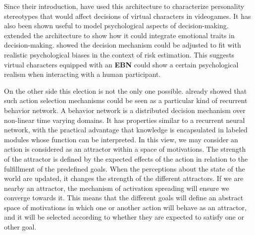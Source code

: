 \documentclass[
		twoside,openright,titlepage,numbers=noenddot,manychapters,
		headinclude,%
                footinclude=false,cleardoublepage=empty,
                BCOR=5mm,
		fontsize=11pt, %
                 enabledeprecatedfontcommands]{scrreprt}
\begin{document}
Since their introduction, \cite{DaSilvaCorreaPinto2005} have used this architecture to characterize personality stereotypes that would affect decisions of virtual characters in videogames. It has also been shown useful to model psychological aspects of decision-making. \cite{johansson2009affective} extended the architecture to show how it could integrate emotional traits in decision-making. \cite{dorer2010modeling} showed the decision mechanism could be adjusted to fit with realistic psychological biases in the context of risk estimation. This suggests virtual characters equipped with an \textbf{EBN} could show a certain psychological realism when interacting with a human participant.

On the other side this election is not the only one possible. \cite{goetz1998arb}  already showed that such action selection mechanisms could be seen as a particular kind of recurrent behavior network. A behavior network is a distributed decision mechanism over non-linear time varying domains. It has properties similar to a recurrent neural network, with the practical advantage that knowledge is encapsulated in labeled modules whose function can be interpreted. In this view, we may consider an action is considered as an attractor within a space of motivations. The strength of the attractor is defined by the expected effects of the action in relation to the fulfillment of the predefined goals. When the perceptions about the state of the world are updated, it changes the strength of the different attractors. If we are nearby an attractor, the mechanism of activation spreading will ensure we converge towards it. 
This means that the different goals will define an abstract space of motivations in which one or another action will behave as an attractor, and it will be selected according to whether they are expected to satisfy one or other goal. %
 
\end{document}
